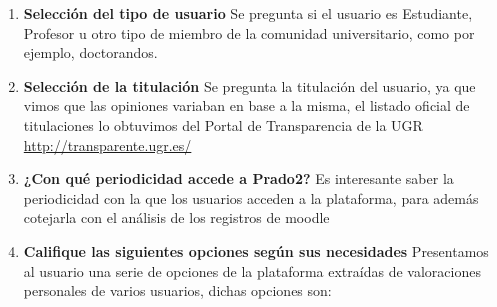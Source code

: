 \begin{enumerate}

  \item \textbf{Selección del tipo de usuario} Se pregunta si el usuario es Estudiante, Profesor u otro tipo de miembro de la comunidad universitario, como por ejemplo, doctorandos.


  \item \textbf{Selección de la titulación} Se pregunta la titulación del usuario, ya que vimos que las opiniones variaban en base a la misma, el listado oficial de titulaciones lo obtuvimos del Portal de Transparencia de la UGR \url{http://transparente.ugr.es/}


  \item \textbf{¿Con qué periodicidad accede a Prado2?} Es interesante saber  la periodicidad con la que los usuarios acceden a la plataforma, para además cotejarla con el análisis de los registros de moodle


  \item \textbf{Califique las siguientes opciones según sus necesidades} Presentamos al usuario una serie de opciones de la plataforma extraídas de valoraciones personales de varios usuarios, dichas opciones son:


\end{enumerate}
